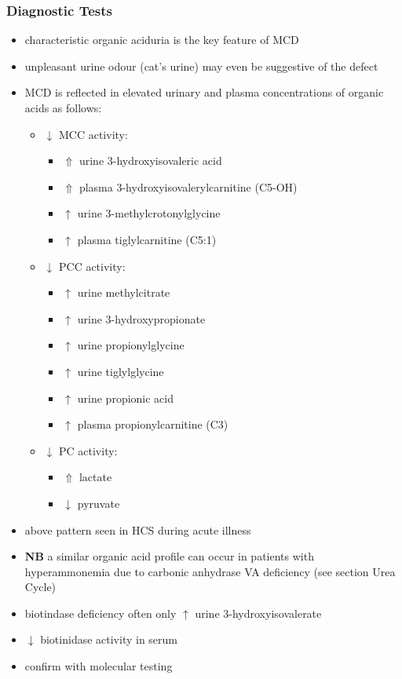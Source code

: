 \documentclass[12pt]{scrartcl}
\begin{document}
\subsubsection{Diagnostic Tests}
\label{sec:org184b5e1}
\begin{itemize}
\item characteristic organic aciduria is the key feature of MCD
\item unpleasant urine odour (cat’s urine) may even be suggestive of the
defect
\item MCD is reflected in elevated urinary and plasma concentrations of
organic acids as follows:
\begin{itemize}
\item \(\downarrow\) MCC activity:
\begin{itemize}
\item \(\Uparrow\) urine 3-hydroxyisovaleric acid
\item \(\Uparrow\) plasma 3-hydroxyisovalerylcarnitine (C5-OH)
\item \(\uparrow\) urine 3-methylcrotonylglycine
\item \(\uparrow\) plasma tiglylcarnitine (C5:1)
\end{itemize}
\item \(\downarrow\) PCC activity:
\begin{itemize}
\item \(\uparrow\) urine methylcitrate
\item \(\uparrow\) urine 3-hydroxypropionate
\item \(\uparrow\) urine propionylglycine
\item \(\uparrow\) urine tiglylglycine
\item \(\uparrow\) urine propionic acid
\item \(\uparrow\) plasma propionylcarnitine (C3)
\end{itemize}
\item \(\downarrow\) PC activity:
\begin{itemize}
\item \(\Uparrow\) lactate
\item \(\downarrow\) pyruvate
\end{itemize}
\end{itemize}
\item above pattern seen in HCS during acute illness
\item \textbf{NB} a similar organic acid profile can occur in patients with
hyperammonemia due to carbonic anhydrase VA deficiency (see section Urea Cycle)
\item biotindase deficiency often only \(\uparrow\) urine 3-hydroxyisovalerate
\item \(\downarrow\) biotinidase activity in serum
\item confirm with molecular testing
\end{itemize}
\end{document}
